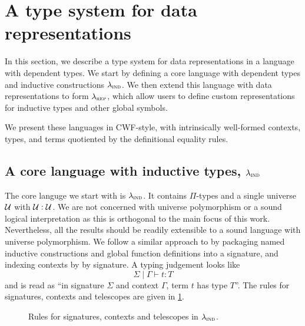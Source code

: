 \section{A type system for data representations}\label{sec:type-system}

In this section, we describe a type system for data representations in a
language with dependent types. We start by defining a core language with
dependent types and inductive constructions $\lambda_{\textsc{ind}}$. We then extend this
language with data representations to form $\lambda_{\textsc{rep}}$, which allow users to
define custom representations for inductive types and other global symbols.

We present these languages in CWF-style, with intrinsically well-formed
contexts, types, and terms quotiented by the definitional equality rules.

\subsection{A core language with inductive types, $\lambda_{\textsc{ind}}$}\label{sub:lambdaind}

The core languge we start with is $\lambda_{\textsc{ind}}$. It contains $\Pi$-types and a
single universe $\mathcal{U}$ with $\mathcal{U} : \mathcal{U}$. We are not concerned with universe
polymorphism or a sound logical interpretation as this is orthogonal to the main
focus of this work. Nevertheless, all the results should be readily extensible
to a sound language with universe polymorphism.
We follow a similar approach to
\cite{Cockx2018-fk} by packaging named inductive constructions and
global function definitions into a signature, and indexing contexts by
by signature. A typing judgement looks like
\[
  \Sigma \mid \Gamma \vdash t : T
\]
and is read as ``in signature $\Sigma$ and context $\Gamma$, term $t$ has type
$T$''. The rules for signatures, contexts and telescopes are given in \cref{fig:lambdaind-sig-rules}.

\begin{figure}[h]
  \caption{Rules for signatures, contexts and telescopes in $\lambda_{\textsc{ind}}$.}
  \label{fig:lambdaind-sig-rules}
\end{figure}

